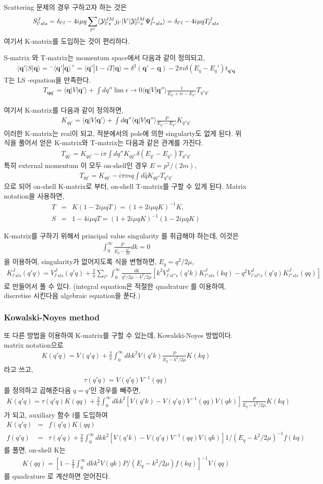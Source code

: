 \documentclass[10pt]{article}
\def\bm{\boldsymbol}
\newcommand{\bea}{\begin{eqnarray}}
\newcommand{\eea}{\end{eqnarray}}
\newcommand{\no}{\nonumber \\}
\def\vq{{\bm q}}
\def\la{\langle}
\def\ra{\rangle}
\begin{document}
Scattering 문제의 경우 구하고자 하는 것은 
\bea
S^J_{l' s ls}=\delta_{l'l}-4i\mu q\sum_{l''}
      \la {\cal Y}^{JM}_{l's} j_{l'}|V|{\cal Y}^{JM}_{l''s} \Psi^J_{l''s ls}\ra
  =\delta_{l'l}-4i\mu q T^{J}_{l's ls}
\eea
여기서 K-matrix를 도입하는 것이 편리하다. 

S-matrix 와 T-matrix는 momentum space에서 다음과 같이 정의되고,
\bea
\la \vq'|S|\vq\ra
={}^-\la \vq'|\vq\ra^{+}=\la \vq'|1- i T |\vq\ra
=\delta^{3}(\vq'-\vq)-2\pi i\delta(E_q-E_q') t_{\vq'\vq} 
\eea
T는 LS -equation을 만족한다.
\bea
T_{\vq\vq'}=\la \vq|V|\vq'\ra
                    +\int dq'' \lim{\epsilon\to 0}
                      \la \vq|V|\vq''\ra \frac{1}{E_{q'}+i\epsilon-E_{q''}}T_{q'' q'}
\eea

여기서 K-matrix를 다음과 같이 정의하면,
\bea
K_{qq'}= \la \vq|V|\vq'\ra+\int d\vq''\la \vq|V|\vq''\ra
                           \frac{P}{E_{q'}-E_{q''}}K_{q'' q'}
\eea
이러한 K-matrix는 real이 되고, 적분에서의 pole에 의한 singularty도 없게 된다.
위 식을 풀어서 얻은 K-matrix와 T-matrix는  다음과 같은 관계를 가진다.
\bea
T_{q q'}=K_{qq'}-i\pi\int dq'' K_{q q''}\delta(E_{q'}-E_{q''})T_{q'' q'}
\eea 
특히 external momentum 이 모두 on-shell인 경우 $E=p^2/(2m)$,
\bea
T_{qq'}=K_{qq'}-i\pi m q\int d\hat{q} K_{qq''}T_{q'' q'}
\eea
으로 되어 on-shell K-matrix로 부터, on-shell T-matrix를 구할 수 있게 된다. 
Matrix notation을 사용하면,
\bea
T&=&K(1-2i\mu q T)=(1+2i\mu q K)^{-1} K,\no 
S&=&1-4i\mu q T=(1+2i\mu q K)^{-1}(1-2i\mu q K)
\eea

K-matrix를 구하기 위해서 principal value singularity 를 취급해야 하는데,
이것은 
\bea
\int_0^\infty \frac{P}{E_q-\frac{k^2}{2\mu}}d k=0
\eea
을 이용하여, singularity가 없어지도록 식을 변형하면, $E_q=q^2/2\mu$,
\bea
K^J_{l's ls}(q'q)=V^J_{l's ls}(q'q)+\frac{2}{\pi}\sum_{l''}\int_0^\infty 
              \frac{dk}{q^2/2\mu-k^2/2\mu}
          [k^2 V^J_{l' s l'' s}(q' k) K^J_{l'' s ls}(k q)
          -q^2 V^J_{l's l'' s}(q' q) K^J_{l'' s ls}(qq)]
\eea
로 만들어서 풀 수 있다. (integral equation은 적절한 quadrature 를 
이용하여, discretise 시킨다음 algebraic equation을 푼다.)

\subsubsection{Kowalski-Noyes method }
또 다른 방법을 이용하여 K-matrix를 구할 수 있는데, Kowalski-Noyes 방법이다.
matrix notation으로
\bea
K(q' q)=V(q'q)+\frac{2}{\pi}\int_0^\infty dk k^2 V(q' k)\frac{P}{E_q-k^2/2\mu}K(kq)
\eea
라고 쓰고, 
\bea
\tau(q'q)=V(q'q)V^{-1}(qq)
\eea
를 정의하고 곱해준다음 $q=q'$인 경우를 빼주면, 
\bea
K(q'q)=\tau(q'q)K(qq)+\frac{2}{\pi}\int_0^\infty dk k^2
       [V(q' k)-V(q'q)V^{-1}(qq)V(qk)]\frac{P}{E_q-k^2/2\mu}K(kq)
\eea 
가 되고, auxiliary 함수 f를 도입하여
\bea
K(q'q)&=&f(q'q)K(qq) \no
f(q'q)&=&\tau(q'q)+\frac{2}{\pi}\int_0^\infty dk k^2[V(q' k)-V(q'q) V^{-1}(qq)V(qk)]
              1/(E_q-k^2/2\mu)^{-1} f(kq)
\eea 
를 풀면, on-shell K는 
\bea
K(qq)=[1-\frac{2}{\pi}\int_0^\infty dk k^2 V(qk) P/(E_q-k^2/2\mu) f(kq)]^{-1} V(qq)
\eea
를 quadrature 로 계산하면 얻어진다.
\end{document}

